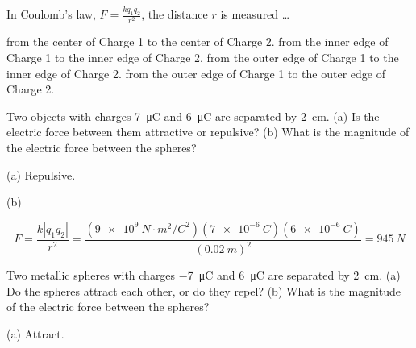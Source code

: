 \documentclass[answers]{exam}
\begin{document}
\begin{questions}



\question
In Coulomb's law, $\displaystyle F = \frac{kq_1q_2}{r^2}$, the distance $r$ is measured
\ldots

\begin{randomizechoices}
    \correctchoice from the center of Charge 1 to the center of Charge 2.
    \choice from the inner edge of Charge 1 to the inner edge of Charge 2.
    \choice from the outer edge of Charge 1 to the inner edge of Charge 2.
    \choice from the outer edge of Charge 1 to the outer edge of Charge 2.
\end{randomizechoices}



\question \label{z4pMlx}
Two objects with charges \SI{7}{\micro C} and \SI{6}{\micro C} are separated by \SI{2}{cm}. (a) Is the electric force between them attractive or repulsive? (b) What is the magnitude of the electric force between the spheres?

\begin{solution}
(a) Repulsive. 

(b) 

\begin{equation*}
    F = \frac{k \left|q_1 q_2\right|}{r^2} = \frac{\left(\SI{9e9}{N\cdot m^2/C^2}\right)(\SI{7e-6}{C})(\SI{6e-6}{C})}{\left(\SI{0.02}{m}\right)^2} = \boxed{\SI{945}{N}}
\end{equation*}

\end{solution}


\question \label{TPIAio}
Two metallic spheres with charges \SI{-7}{\micro C} and \SI{6}{\micro C} are separated by \SI{2}{cm}. (a) Do the spheres attract each other, or do they repel? (b) What is the magnitude of the electric force between the spheres?

\begin{solution}
(a) Attract. 


\end{solution}
\end{questions}
\end{document}
